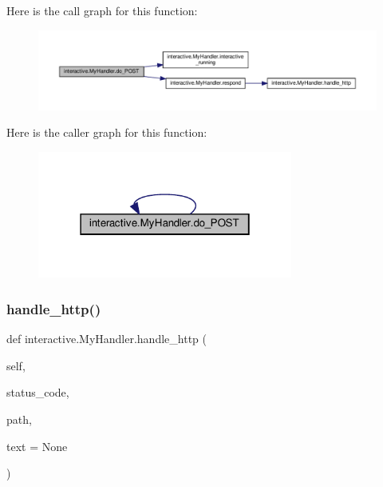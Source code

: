 Here is the call graph for this function\+:
\nopagebreak
\begin{figure}[H]
\begin{center}
\leavevmode
\includegraphics[width=350pt]{classinteractive_1_1MyHandler_a59070990ac52dada4b7c532f76af749f_cgraph}
\end{center}
\end{figure}
Here is the caller graph for this function\+:
\nopagebreak
\begin{figure}[H]
\begin{center}
\leavevmode
\includegraphics[width=238pt]{classinteractive_1_1MyHandler_a59070990ac52dada4b7c532f76af749f_icgraph}
\end{center}
\end{figure}
\mbox{\label{classinteractive_1_1MyHandler_a5941a3caf26e4d5931324edbdbf51f8b}} 
\subsubsection{\texorpdfstring{handle\+\_\+http()}{handle\_http()}\hspace{0.1cm}{\footnotesize\ttfamily [1/2]}}
{\footnotesize\ttfamily def interactive.\+My\+Handler.\+handle\+\_\+http (\begin{DoxyParamCaption}\item[{}]{self,  }\item[{}]{status\+\_\+code,  }\item[{}]{path,  }\item[{}]{text = {\ttfamily None} }\end{DoxyParamCaption})}

